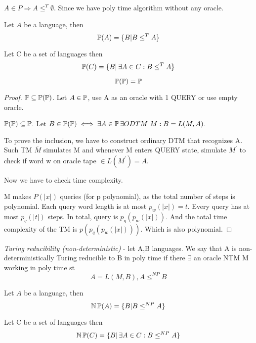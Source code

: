 \begin{example}
	$A \in P \Rightarrow A \leq^T \emptyset$. Since we have poly time algorithm without any oracle.
\end{example}

\begin{definition}
	Let $A$ be a language, then
	\[ \operatorname{\mathbb{P}}(A) = \{ B | B \leq^T A \} \]
\end{definition}
\begin{definition}
	Let C be a set of languages then
	\[ \operatorname{\mathbb{P}}(C) = \{ B |\, \exists A \in C: B \leq^T A \} \]
\end{definition}

\begin{observation}
	\[ \operatorname{\mathbb{P}}(\operatorname{\mathbb{P}}) = \operatorname{\mathbb{P}} \]
\end{observation}
\begin{proof}
	$ \operatorname{\mathbb{P}} \subseteq \operatorname{\mathbb{P}}(\operatorname{\mathbb{P}})$. Let $A \in \operatorname{\mathbb{P}}$, use A as an oracle with 1 QUERY or use empty oracle.

	$\operatorname{\mathbb{P}}(\operatorname{\mathbb{P}}) \subseteq \operatorname{\mathbb{P}}$. Let $B \in \TP(\TP) \iff \exists A \in \TP \exists ODTM\ M: B = L(M, A)$.

	To prove the inclusion, we have to construct ordinary DTM that recognizes A.
	Such TM $\overline{M}$ simulates M and whenever M enters QUERY state, simulate $M^{\prime}$ to check if word w on oracle tape $\in L(M^{\prime}) = A$.

	Now we have to check time complexity.

	M makes $P(|x|)$ queries (for p polynomial), as the total number of steps is polynomial.
	Each query word length is at most $p_w(|x|) = t$.
	Every query has at most $p_q(|t|)$ steps.
	In total, query is $p_q(p_w(|x|))$.
	And the total time complexity of the TM is $p(p_q(p_w(|x|)))$.
	Which is also polynomial.
\end{proof}

\begin{definition}
	\emph{Turing reducibility (non-deterministic)} - let A,B languages.
	We say that A is non-deterministically Turing reducible to B in poly time if there $\exists$ an oracle NTM M working in poly time st
	\[ A = L(M, B), A \leq^{NP} B \]
\end{definition}

\begin{definition}
	Let $A$ be a language, then
	\[ \operatorname{\operatorname{\mathbb{N}}\mathbb{P}}(A) = \{ B | B \leq^{NP} A \} \]
\end{definition}
\begin{definition}
	Let C be a set of languages then
	\[ \operatorname{\operatorname{\mathbb{N}}\mathbb{P}}(C) = \{ B |\, \exists A \in C: B \leq^{NP} A \} \]
\end{definition}

